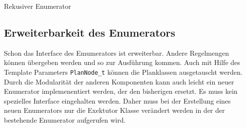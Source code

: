 \begin{algorithm}[ht]
\SetAlgoLined
{}

\label{Pseudocod:enumerator}
\caption{Rekusiver Enumerator}
\end{algorithm}




\subsection{Erweiterbarkeit des Enumerators}

Schon das Interface des Emumerators ist erweiterbar. Andere Regelmengen können übergeben werden und so zur Ausführung kommen. Auch mit Hilfe des Template Parameters \texttt{PlanNode\_t} können die Planklassen ausgetauscht werden. Durch die Modularität der anderen Komponenten kann auch leicht ein neuer Enumerator implemenentiert werden, der den bisherigen ersetzt. Es muss kein spezielles Interface eingehalten werden. Daher muss bei der Erstellung eines neuen Enumerators nur die Exektutor Klasse verändert werden in der der bestehende Enumerator aufgerufen wird.